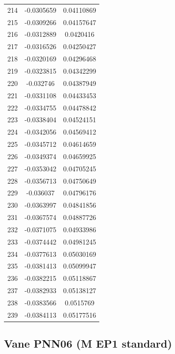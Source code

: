 \documentclass[a4paper, 11pt, oneside]{report}
\begin{document}
{\begin{longtable}{|c|c|c|}
214 & -0.0305659 & 0.04110869 \\
215 & -0.0309266 & 0.04157647 \\
216 & -0.0312889 & 0.0420416  \\
217 & -0.0316526 & 0.04250427 \\
218 & -0.0320169 & 0.04296468 \\
219 & -0.0323815 & 0.04342299 \\
220 & -0.032746  & 0.04387949 \\
221 & -0.0331108 & 0.04433453 \\
222 & -0.0334755 & 0.04478842 \\
223 & -0.0338404 & 0.04524151 \\
224 & -0.0342056 & 0.04569412 \\
225 & -0.0345712 & 0.04614659 \\
226 & -0.0349374 & 0.04659925 \\
227 & -0.0353042 & 0.04705245 \\
228 & -0.0356713 & 0.04750649 \\
229 & -0.036037  & 0.04796176 \\
230 & -0.0363997 & 0.04841856 \\
231 & -0.0367574 & 0.04887726 \\
232 & -0.0371075 & 0.04933986 \\
233 & -0.0374442 & 0.04981245 \\
234 & -0.0377613 & 0.05030169 \\
235 & -0.0381413 & 0.05099947 \\
236 & -0.0382215 & 0.05118867 \\
237 & -0.0382933 & 0.05138127 \\
238 & -0.0383566 & 0.0515769  \\
239 & -0.0384113 & 0.05177516 \\
\hline
\end{longtable}
\unskip
\unpenalty
\unpenalty}

\begin{multicols}{2}
\unvbox\ltmcbox
\end{multicols}

\subsection{Vane PNN06 (M EP1 standard)}
\end{document}
